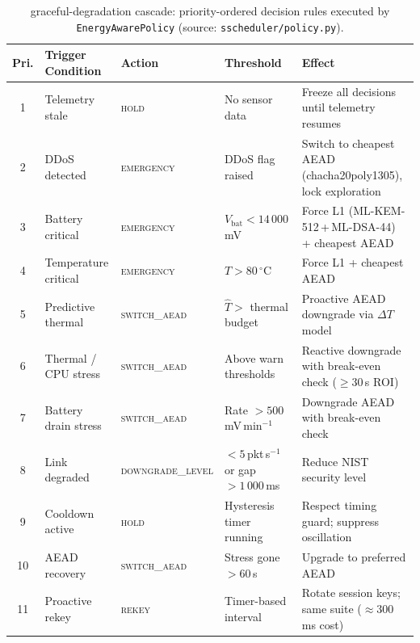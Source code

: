 \begin{table}[!t]
\centering
\caption{\mdeas{} graceful-degradation cascade: priority-ordered
decision rules executed by \texttt{EnergyAwarePolicy}
(source: \texttt{sscheduler/policy.py}).}
\label{tab:graceful-degradation}
\footnotesize
\setlength{\tabcolsep}{4pt}
\renewcommand{\arraystretch}{1.15}
\begin{tabular}{@{}clllp{5.2cm}@{}}
\toprule
\textbf{Pri.} & \textbf{Trigger Condition} & \textbf{Action} & \textbf{Threshold} & \textbf{Effect} \\
\midrule
1  & Telemetry stale          & \textsc{hold}           & No sensor data            & Freeze all decisions until telemetry resumes \\
2  & DDoS detected            & \textsc{emergency}      & DDoS flag raised          & Switch to cheapest AEAD (chacha20poly1305), lock exploration \\
3  & Battery critical         & \textsc{emergency}      & $V_{\mathrm{bat}} < 14\,000$\,mV & Force L1 (ML-KEM-512\,+\,ML-DSA-44) + cheapest AEAD \\
4  & Temperature critical     & \textsc{emergency}      & $T > 80\,{^\circ}$C         & Force L1 + cheapest AEAD \\
5  & Predictive thermal       & \textsc{switch\_aead}   & $\hat{T} >$ thermal budget & Proactive AEAD downgrade via $\Delta T$ model \\
6  & Thermal / CPU stress     & \textsc{switch\_aead}   & Above warn thresholds     & Reactive downgrade with break-even check ($\geq 30$\,s ROI) \\
7  & Battery drain stress     & \textsc{switch\_aead}   & Rate $> 500$\,mV\,min$^{-1}$ & Downgrade AEAD with break-even check \\
8  & Link degraded            & \textsc{downgrade\_level} & $< 5$\,pkt\,s$^{-1}$ or gap $> 1\,000$\,ms & Reduce NIST security level \\
9  & Cooldown active          & \textsc{hold}           & Hysteresis timer running  & Respect timing guard; suppress oscillation \\
10 & AEAD recovery            & \textsc{switch\_aead}   & Stress gone $> 60$\,s     & Upgrade to preferred AEAD \\
11 & Proactive rekey          & \textsc{rekey}          & Timer-based interval      & Rotate session keys; same suite ($\approx 300$\,ms cost) \\

\end{tabular}
\end{table}
